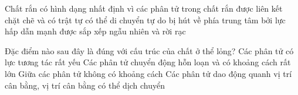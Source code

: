 
\begin{ex}
 {\color{red}\footnotesize\ttfamily [L12C1B1-TN-4]}\par %
 Chất rắn có hình dạng nhất định vì các phân tử trong chất rắn
 \choice
 {\True được liên kết chặt chẽ và có trật tự}
 {có thể di chuyển tự do}
 {bị hút về phía trung tâm bởi lực hấp dẫn mạnh}
 {được sắp xếp ngẫu nhiên và rời rạc}
\end{ex}

\begin{ex}
 {\color{red}\footnotesize\ttfamily [L12C1B1-TN-6]}\par %
 Đặc điểm nào sau đây là đúng với cấu trúc của chất ở thể lỏng?
 \choice
 {Các phân tử có lực tương tác rất yếu}
 {Các phân tử chuyển động hỗn loạn và có khoảng cách rất lớn}
 {Giữa các phân tử không có khoảng cách}
 {\True Các phân tử dao động quanh vị trí cân bằng, vị trí cân bằng có thể dịch chuyển}
\end{ex}

